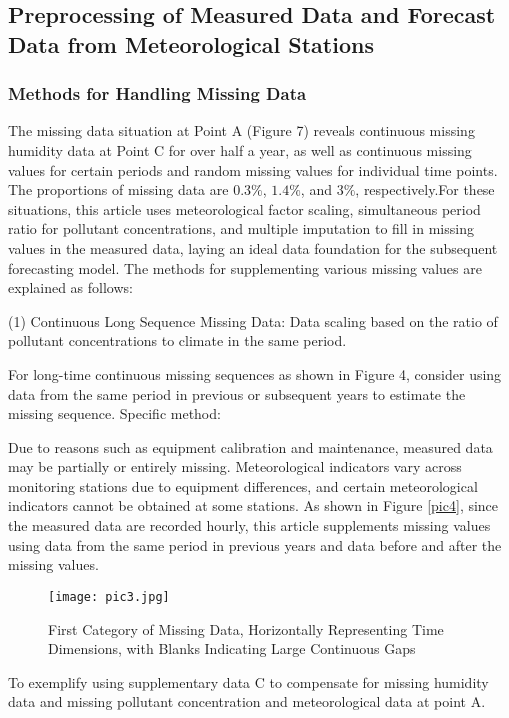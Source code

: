 \documentclass[12pt]{article}
\begin{document}
\subsection{Preprocessing of Measured Data and Forecast Data from Meteorological Stations}

\subsubsection{Methods for Handling Missing Data}
The missing data situation at Point A (Figure 7) reveals continuous missing humidity data at Point C for over half a year, as well as continuous missing values for certain periods and random missing values for individual time points. The proportions of missing data are $0.3\%$, $1.4\%$, and $3\%$, respectively.For these situations, this article uses meteorological factor scaling, simultaneous period ratio for pollutant concentrations, and multiple imputation to fill in missing values in the measured data, laying an ideal data foundation for the subsequent forecasting model. The methods for supplementing various missing values are explained as follows:

(1) Continuous Long Sequence Missing Data: Data scaling based on the ratio of pollutant concentrations to climate in the same period.

For long-time continuous missing sequences as shown in Figure 4, consider using data from the same period in previous or subsequent years to estimate the missing sequence. Specific method:

Due to reasons such as equipment calibration and maintenance, measured data may be partially or entirely missing. Meteorological indicators vary across monitoring stations due to equipment differences, and certain meteorological indicators cannot be obtained at some stations. As shown in Figure \ref{pic4}, since the measured data are recorded hourly, this article supplements missing values using data from the same period in previous years and data before and after the missing values.

\begin{figure}[H]
	\caption{First Category of Missing Data, Horizontally Representing Time Dimensions, with Blanks Indicating Large Continuous Gaps}
	\label{pic3}
	\centering
	\texttt{[image: pic3.jpg]}
\end{figure}


To exemplify using supplementary data C to compensate for missing humidity data and missing pollutant concentration and meteorological data at point A.
\end{document}
